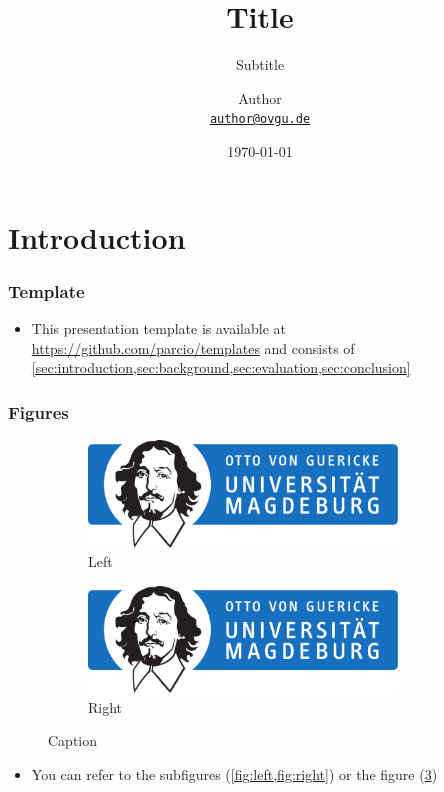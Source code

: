\documentclass[
	aspectratio=169,
	compress,
]{beamer}
\title{Title}
\subtitle{Subtitle}
\author[Author]{
Author\\
{\footnotesize\href{mailto:author@ovgu.de}{\nolinkurl{author@ovgu.de}}}
}
\date{\today}
\institute{
Faculty of Computer Science\\
Otto von Guericke University Magdeburg
}
\newcommand{\navframetitle}[1]{\frametitle{#1\hfill{\footnotesize\lastsection{}}}}
\begin{document}
\maketitle

\section{Introduction}
\label{sec:introduction}

\begin{frame}
	\navframetitle{Template}

	\begin{itemize}
		\item This presentation template is available at \url{https://github.com/parcio/templates} and consists of \cref{sec:introduction,sec:background,sec:evaluation,sec:conclusion}
	\end{itemize}
\end{frame}

\begin{frame}
	\navframetitle{Figures}

	\begin{figure}[ht]
		\centering
		\begin{subfigure}{0.45\textwidth}
			\centering
			\includegraphics[width=0.9\textwidth]{OVGU-INF}
			\caption{Left}
			\label{fig:left}
		\end{subfigure}
		\begin{subfigure}{0.45\textwidth}
			\centering
			\includegraphics[width=0.9\textwidth]{OVGU-INF}
			\caption{Right}
			\label{fig:right}
		\end{subfigure}
		\caption{Caption}
		\label{fig:both}
	\end{figure}

	\begin{itemize}
		\item You can refer to the subfigures (\cref{fig:left,fig:right}) or the figure (\cref{fig:both})
	\end{itemize}
\end{frame}
\end{document}
